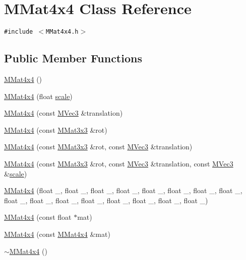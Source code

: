 \hypertarget{class_m_mat4x4}{
\section{MMat4x4 Class Reference}
\label{class_m_mat4x4}
}
{\tt \#include $<$MMat4x4.h$>$}

\subsection*{Public Member Functions}
\begin{CompactItemize}
\item 
\hyperlink{class_m_mat4x4_22ce2003a15d80e2902ffbd11bd40608}{MMat4x4} ()
\item 
\hyperlink{class_m_mat4x4_6365cf6fe5861ab8dbbe5505262f3883}{MMat4x4} (float \hyperlink{glext__bak_8h_281421b881aa7a1266842b73a3bc7655}{scale})
\item 
\hyperlink{class_m_mat4x4_e9a2a999304bfaffaf1b5fa82866a234}{MMat4x4} (const \hyperlink{class_m_vec3}{MVec3} \&translation)
\item 
\hyperlink{class_m_mat4x4_338da41554a385f5d91fbd3e5a8f88e3}{MMat4x4} (const \hyperlink{class_m_mat3x3}{MMat3x3} \&rot)
\item 
\hyperlink{class_m_mat4x4_fc1a4ed07e9d2baf9d6f333a00ee76a5}{MMat4x4} (const \hyperlink{class_m_mat3x3}{MMat3x3} \&rot, const \hyperlink{class_m_vec3}{MVec3} \&translation)
\item 
\hyperlink{class_m_mat4x4_f0ab4e1ba04f32bac44bc7c8e6d5e037}{MMat4x4} (const \hyperlink{class_m_mat3x3}{MMat3x3} \&rot, const \hyperlink{class_m_vec3}{MVec3} \&translation, const \hyperlink{class_m_vec3}{MVec3} \&\hyperlink{glext__bak_8h_281421b881aa7a1266842b73a3bc7655}{scale})
\item 
\hyperlink{class_m_mat4x4_501c2ede3902e23571147ea5273c2904}{MMat4x4} (float \_, float \_, float \_, float \_, float \_, float \_, float \_, float \_, float \_, float \_, float \_, float \_, float \_, float \_, float \_, float \_)
\item 
\hyperlink{class_m_mat4x4_9276085ed15c187101647e97b63b7ee8}{MMat4x4} (const float $\ast$mat)
\item 
\hyperlink{class_m_mat4x4_7eda878fcc79597fa4a04a54f640e02b}{MMat4x4} (const \hyperlink{class_m_mat4x4}{MMat4x4} \&mat)
\item 
\hyperlink{class_m_mat4x4_753165b1650fd6150f9984cd58f9697a}{$\sim$MMat4x4} ()
\item 

\end{CompactItemize}
